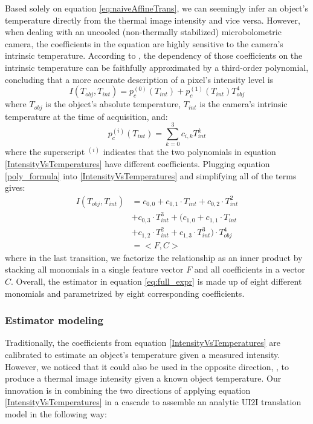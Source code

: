 Based solely on equation \ref{eq:naiveAffineTrans}, we can seemingly infer an object's temperature directly from the thermal image intensity and vice versa.
However, when dealing with an uncooled (non-thermally stabilized) microbolometric camera, the coefficients in the equation are highly sensitive to the camera's intrinsic temperature. 
According to \cite{10.1117/1.OE.52.6.061304}, the dependency of those coefficients on the intrinsic temperature can be faithfully approximated by a third-order polynomial, concluding that a more accurate description of a pixel's intensity level is
\begin{equation} \label{IntensityVsTemperatures}
  I(T_\mathit{obj}, T_\mathit{int}) = p^{(0)}_c(T_\mathit{int}) + p^{(1)}_c(T_\mathit{int}) T^4_\mathit{obj}
\end{equation}
where $T_\mathit{obj}$ is the object's absolute temperature, $T_\mathit{int}$ is the camera's intrinsic temperature at the time of acquisition, and:
\begin{equation} \label{poly_formula}
  p^{(i)}_c(T_\mathit{int}) = \sum_{k=0}^3  c_{i,k} T_\mathit{int}^k
\end{equation}
where the superscript $^{(i)}$ indicates that the two polynomials in equation \ref{IntensityVsTemperatures} have different coefficients.
Plugging equation \ref{poly_formula} into \ref{IntensityVsTemperatures} and simplifying all of the terms gives:
\begin{equation} \label{eq:full_expr}
  \begin{split}
    I(T_\mathit{obj}, T_\mathit{int}) &= c_{0,0} + c_{0,1} \cdot T_\mathit{int} + c_{0,2} \cdot T^2_\mathit{int} \\
    & + c_{0,3} \cdot T^3_\mathit{int} + (c_{1,0} + c_{1,1} \cdot T_\mathit{int} \\
    & + c_{1,2} \cdot T^2_\mathit{int} + c_{1,3} \cdot T^3_\mathit{int}) \cdot T^4_\mathit{obj} \\
    &= <F, C>
  \end{split}
\end{equation}
where in the last transition, we factorize the relationship as an inner product by stacking all monomials in a single feature vector $F$ and all coefficients in a vector $C$.
Overall, the estimator in equation \ref{eq:full_expr} is made up of eight different monomials and parametrized by eight corresponding coefficients.

\subsubsection{Estimator modeling}
Traditionally, the coefficients from equation \ref{IntensityVsTemperatures} are calibrated to estimate an object's temperature given a measured intensity.
However, we noticed that it could also be used in the opposite direction, \ie, to produce a thermal image intensity given a known object temperature. 
Our innovation is in combining the two directions of applying equation \ref{IntensityVsTemperatures} in a cascade to assemble an analytic UI2I translation model in the following way: 

